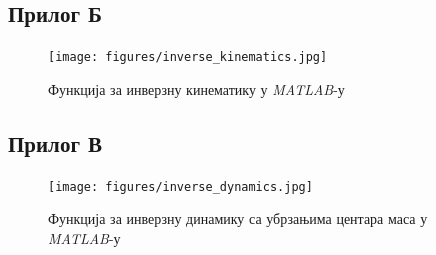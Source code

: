 \documentclass[12pt]{article}
\begin{document}
\subsection{Прилог Б}
\begin{figure}[H]
    \raggedright
    \texttt{[image: figures/inverse\_kinematics.jpg]}
    \caption{Функција за инверзну кинематику у \textit{MATLAB}-у}
    \label{fig:inverzna_kinematika_matlab}
\end{figure}
\subsection{Прилог В}
\begin{figure}[H]
    \raggedright
    \texttt{[image: figures/inverse\_dynamics.jpg]}
    \caption{Функција за инверзну динамику са убрзањима центара маса у \textit{MATLAB}-у}
    \label{fig:inverzna_dinamika_matlab}
\end{figure}

\newpage
\end{document}
